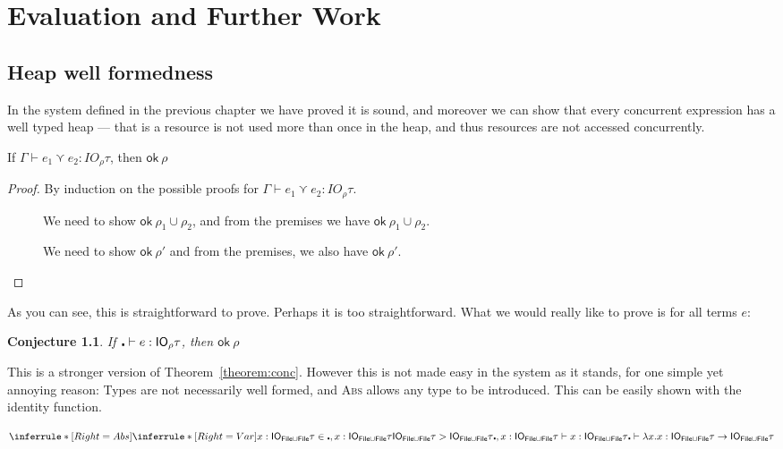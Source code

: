 \chapter{Evaluation and Further Work}\label{cha:evaluation}
\section{Heap well formedness}
In the system defined in the previous chapter we have proved it is
sound, and moreover we can show that every concurrent expression has a
well typed heap --- that is a resource is not used more than once in the
heap, and thus resources are not accessed concurrently.

\begin{theorem}\label{theorem:conc}
  If $\Gamma \vdash e_1 \curlyvee e_2 : IO_\rho \tau$, then $\textsf{ok} \ \rho$
\end{theorem}
\begin{proof}
  By induction on the possible proofs for $\Gamma \vdash e_1 \curlyvee e_2 : IO_\rho \tau$.
  \begin{description}
  \item[\textmd{}]
    We need to show $\textsf{ok} \ \rho_1 \cup \rho_2$, and from the premises we have $\textsf{ok} \ \rho_1 \cup \rho_2$.
  \item[\textmd{}]
    We need to show $\textsf{ok} \ \rho'$ and from the premises, we also have $\textsf{ok} \ \rho'$. 
  \end{description}
\end{proof}
As you can see, this is straightforward to prove. Perhaps it is too
straightforward. What we would really like to prove is for all terms
$e$:
\newtheorem{conjecture}{Conjecture}
\begin{conjecture}\label{conjecture:strongconc}
  If $\centerdot \vdash e : \mathsf{IO}_\rho \tau$, then $\textsf{ok} \ \rho$
\end{conjecture}
This is a stronger version of Theorem~\ref{theorem:conc}. However this
is not made easy in the system as it stands, for one simple yet
annoying reason: Types are not necessarily well formed, and
\textsc{Abs} allows any type to be introduced. This can be easily
shown with the identity function.

\[
  \inferrule*[Right=Abs]{
  \inferrule*[Right=Var]{x : \IO_{\textsf{File} \cup \textsf{File}} \tau  \in
    \centerdot , x : \IO_{\textsf{File} \cup \textsf{File}} \tau \\  \IO_{\textsf{File} \cup \textsf{File}} \tau >
    \IO_{\textsf{File} \cup \textsf{File}} \tau }{\centerdot , x : \IO_{\textsf{File} \cup
      \textsf{File}} \tau \vdash x : \IO_{\textsf{File} \cup \textsf{File}} \tau}
}
{\centerdot \vdash \lambda x . x : \IO_{\textsf{File} \cup \textsf{File}} \tau \rightarrow \IO_{\textsf{File} \cup \textsf{File}} \tau}
\]

